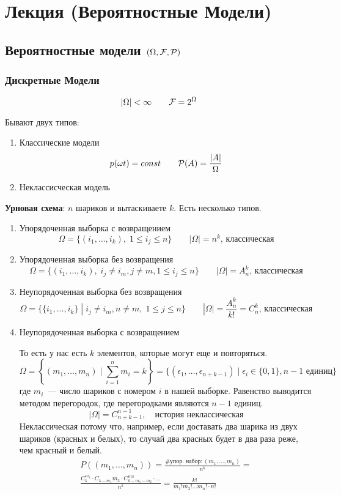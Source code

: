 \section{Лекция (Вероятностные Модели)}

\subsection{Вероятностные модели $(\Omega, \mathcal{F}, \mathcal{P})$}

\subsubsection{Дискретные Модели}
\[ |\Omega| < \infty \qquad \mathcal{F} = 2^\Omega\]

Бывают двух типов:
\begin{enumerate}
    \item Классические модели
        \[ p(\omega t) = const \qquad \mathcal{P} (A) = \frac{|A|}{\Omega} \]
    \item Неклассисческая модель
\end{enumerate}

\textbf{Урновая схема}: $n$ шариков и вытаскиваете $k$. Есть несколько типов.
\begin{enumerate}
\item Упорядоченная выборка с возвращением
    \[\Omega = \{(i_1, \ldots, i_k), \; 1 \leq i_j \leq n\} \qquad |\Omega| = n^k\text{, классическая}\]

\item Упорядоченная выборка без возвращения
    \[\Omega = \{(i_1, \ldots, i_k), \; i_j \neq i_m, j \neq m, 1 \leq i_j \leq n\} \qquad |\Omega| = A^k_n\text{, классическая}\]

\item Неупорядоченная выборка без возвращения
    \[ \Omega = \{ \{i_1, \ldots, i_k\} \;|\; i_j \neq i_m, n\neq m, \; 1\leq j \leq n\} \qquad |\Omega| = \frac{A_n^k}{k!}=C_n^k\text{, классическая} \]

\item Неупорядоченная выборка с возвращением

    То есть у нас есть $k$ элементов, которые могут еще и повторяться.
    \[ \Omega = \left\{ (m_1, \ldots, m_n) \;|\; \sum_{i=1}^nm_i=k\right\} = \{(\epsilon_1,\ldots, \epsilon_{n+k-1}) \;|\; \epsilon_i \in \{0,1\}, n-1\text{ единиц}\} \]
где $m_i$~--- число шариков с номером  $i$ в нашей выборке. Равенство выводится методом перегородок, где перегородками являются $n-1$ единиц.
\[ |\Omega| =  C^{n-1}_{n+k-1}, \quad \text{история неклассическая} \]
Неклассическая потому что, например, если доставать два шарика из двух шариков (красных и белых), то случай два красных будет в два раза реже, чем красный и белый.
\begin{gather*}
P((m_1, \ldots, m_n))  = \frac{\text{\#упор. набор}: (m_1,\ldots,m_n)}{n^k} =\\
\frac{C_k^{m_1}\cdot C_{k-m_1}{m_2} \cdot C_{k-m_1-m_2}^{m3}\cdot \ldots}{n^k} = 
\frac{k!}{m_1!m_2!\ldots m_n!\cdot n!} 
\end{gather*}

\end{enumerate}

